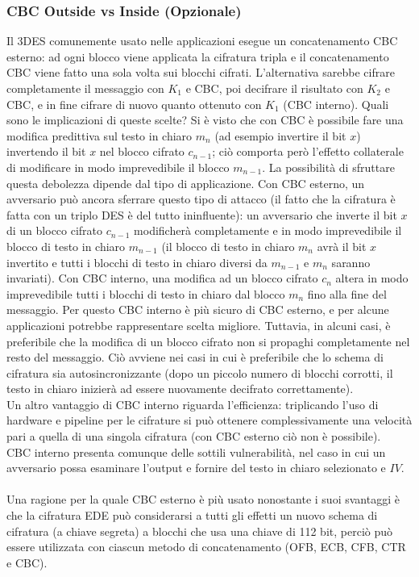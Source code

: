 \subsubsection{CBC Outside vs Inside (Opzionale)}
Il 3DES comunemente usato nelle applicazioni esegue un concatenamento CBC esterno: ad ogni blocco viene applicata la cifratura tripla e il concatenamento CBC viene fatto una sola volta sui blocchi cifrati. L'alternativa sarebbe cifrare completamente il messaggio con $K_{1}$ e CBC, poi decifrare il risultato con $K_{2}$ e CBC, e in fine cifrare di nuovo quanto ottenuto con $K_{1}$ (CBC interno). Quali sono le implicazioni di queste scelte?
\newline \newline
Si è visto che con CBC è possibile fare una modifica predittiva sul testo in chiaro $m_{n}$ (ad esempio invertire il bit $x$) invertendo il bit $x$ nel blocco cifrato $c_{n-1}$; ciò comporta però l'effetto collaterale di modificare in modo imprevedibile il blocco $m_{n-1}$. La possibilità di sfruttare questa debolezza dipende dal tipo di applicazione.
\newline \newline
Con CBC esterno, un avversario può ancora sferrare questo tipo di attacco (il fatto che la cifratura è fatta con un triplo DES è del tutto ininfluente): un avversario che inverte il bit $x$ di un blocco cifrato $c_{n-1}$ modificherà completamente e in modo imprevedibile il blocco di testo in chiaro $m_{n-1}$ (il blocco di testo in chiaro $m_{n}$ avrà il bit $x$ invertito e tutti i blocchi di testo in chiaro diversi da $m_{n-1}$ e $m_{n}$ saranno invariati).
\newline \newline
Con CBC interno, una modifica ad un blocco cifrato $c_{n}$ altera in modo imprevedibile tutti i blocchi di testo in chiaro dal blocco $m_{n}$ fino alla fine del messaggio. Per questo CBC interno è più sicuro di CBC esterno, e per alcune applicazioni potrebbe rappresentare scelta migliore. Tuttavia, in alcuni casi, è preferibile che la modifica di un blocco cifrato non si propaghi completamente nel resto del messaggio. Ciò avviene nei casi in cui è preferibile che lo schema di cifratura sia autosincronizzante (dopo un piccolo numero di blocchi corrotti, il testo in chiaro inizierà ad essere nuovamente decifrato correttamente). \\
Un altro vantaggio di CBC interno riguarda l'efficienza: triplicando l'uso di hardware e pipeline per le cifrature si può ottenere complessivamente una velocità pari a quella di una singola cifratura (con CBC esterno ciò non è possibile).\\
CBC interno presenta comunque delle sottili vulnerabilità, nel caso in cui un avversario possa esaminare l'output e fornire del testo in chiaro selezionato e $IV$.\\ \\
Una ragione per la quale CBC esterno è più usato nonostante i suoi svantaggi è che la cifratura EDE può considerarsi a tutti gli effetti un nuovo schema di cifratura (a chiave segreta) a blocchi che usa una chiave di 112 bit, perciò può essere utilizzata con ciascun metodo di concatenamento (OFB, ECB, CFB, CTR e CBC).
